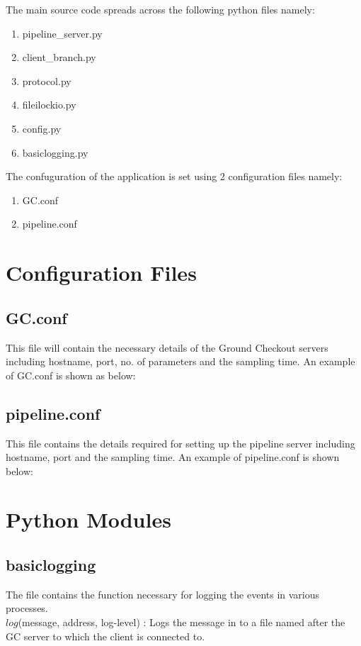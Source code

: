 The main source code spreads across the following python files namely:
\begin{enumerate}
	\item pipeline\_server.py
	\item client\_branch.py
	\item protocol.py
	\item fileilockio.py
	\item config.py
	\item basiclogging.py
\end{enumerate}
The confuguration of the application is set using 2 configuration files namely:
\begin{enumerate}
	\item GC.conf
	\item pipeline.conf
\end{enumerate}

\section{Configuration Files}

\subsection{GC.conf}
This file will contain the necessary details of the Ground Checkout servers
including hostname, port, no. of parameters and the sampling time. An example
of GC.conf is shown as below:


\subsection{pipeline.conf}
This file contains the details required for setting up the pipeline server
including hostname, port and the sampling time. An example of pipeline.conf is
shown below:



\section{Python Modules}

\subsection{basiclogging}
The file contains the function necessary for logging the events in various
processes.\\
$log$(message, address, log-level) : Logs the message
in to a file named after the GC server to which the client is connected to.


